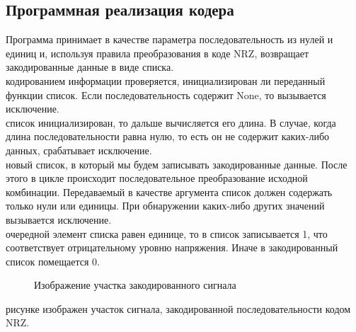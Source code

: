 \documentclass[a4paper14pt]{article}
\begin{document}
\subsection{Программная реализация кодера}
\indent Программа принимает в качестве параметра последовательность из нулей и единиц и, используя правила преобразования в коде NRZ, возвращает закодированные данные в виде списка.\\
 кодированием информации проверяется, инициализирован ли переданный функции список. Если последовательность содержит None, то вызывается исключение.\\
 список инициализирован, то дальше вычисляется его длина. В случае, когда длина последовательности равна нулю, то есть он не содержит каких-либо данных, срабатывает исключение.\\
 новый список, в который мы будем записывать закодированные данные. После этого в цикле происходит последовательное преобразование исходной комбинации. Передаваемый в качестве аргумента список должен содержать только нули или единицы. При обнаружении каких-либо других значений вызывается исключение.\\
 очередной элемент списка равен единице, то в список записывается 1, что соответствует отрицательному уровню напряжения. Иначе в закодированный список помещается 0.\\

\begin{figure}[h!]
    \caption{Изображение участка закодированного сигнала}
\end{figure}

 рисунке изображен участок сигнала, закодированной последовательности кодом NRZ.
\end{document}
